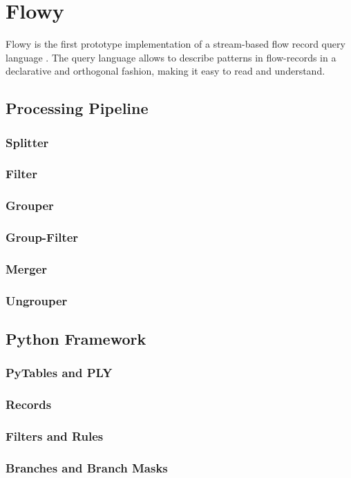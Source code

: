 \chapter{Flowy}\label{ch:flowy-design}

Flowy \cite{kkanev:thesis:2009}\cite{kkanev:2010} is the first prototype implementation of a stream-based flow record query language \cite{vmarinov:thesis:2009}\cite{vmarinov:2009}\cite{vmarinov:2008}. The query language allows to describe patterns in flow-records in a declarative and orthogonal fashion, making it easy to read and understand.

\section{Processing Pipeline}\label{sec:processing-pipeline}
  \subsection{Splitter}\label{subsec:splitter}
  \subsection{Filter}\label{subsec:filter}
  \subsection{Grouper}\label{subsec:grouper}
  \subsection{Group-Filter}\label{subsec:group-filter}
  \subsection{Merger}\label{subsec:merger}
  \subsection{Ungrouper}\label{subsec:ungrouper}

\section{Python Framework}\label{sec:python-framework}
	\subsection{PyTables and PLY}\label{subsec:pytable-ply}
	\subsection{Records}\label{subsec:records}
	\subsection{Filters and Rules}\label{subsec:filters-rules}
	\subsection{Branches and Branch Masks}\label{subsec:branches-branchmasks}
